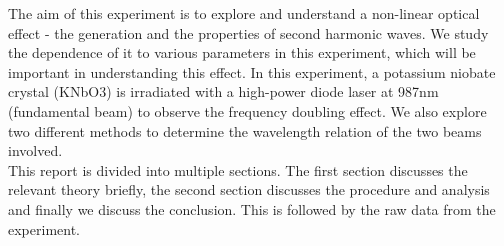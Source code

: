 The aim of this experiment is to explore and understand a non-linear optical effect - the generation and the properties of second harmonic waves. We study the dependence of it to various parameters in this experiment, which will be important in understanding this effect. In this experiment, a potassium niobate crystal (KNbO3) is irradiated with a high-power diode laser at 987nm (fundamental beam) to observe the frequency doubling effect. We also explore two different methods to determine the wavelength relation of the two beams involved.\\
This report is divided into multiple sections. The first section discusses the relevant theory briefly, the second section discusses the procedure and analysis and finally we discuss the conclusion. This is followed by the raw data from the experiment.